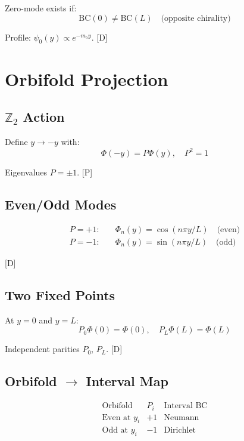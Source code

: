 \documentclass[11pt,a4paper]{article}
\newcommand{\tagD}{\textcolor{blue!70!black}{[D]}}
\newcommand{\tagP}{\textcolor{green!50!black}{[P]}}
\begin{document}
Zero-mode exists if:
\begin{equation}
\label{eq:app-zero-mode}
\text{BC}(0) \neq \text{BC}(L) \quad \text{(opposite chirality)}
\end{equation}

Profile: $\psi_0(y) \propto e^{-m_5 y}$. \tagD

\section{Orbifold Projection}
\label{app:orbifold}

\subsection{$\mathbb{Z}_2$ Action}

Define $y \to -y$ with:
\begin{equation}
\label{eq:app-z2}
\Phi(-y) = P \Phi(y), \quad P^2 = 1
\end{equation}

Eigenvalues $P = \pm 1$. \tagP

\subsection{Even/Odd Modes}

\begin{align}
\label{eq:app-even}
P = +1: \quad & \Phi_n(y) = \cos(n\pi y/L) \quad \text{(even)} \\
\label{eq:app-odd}
P = -1: \quad & \Phi_n(y) = \sin(n\pi y/L) \quad \text{(odd)}
\end{align}

\tagD

\subsection{Two Fixed Points}

At $y = 0$ and $y = L$:
\begin{equation}
\label{eq:app-fixed}
P_0 \Phi(0) = \Phi(0), \quad P_L \Phi(L) = \Phi(L)
\end{equation}

Independent parities $P_0$, $P_L$. \tagD

\subsection{Orbifold $\to$ Interval Map}

\begin{equation}
\label{eq:app-orb-int}
\begin{array}{c|c|c}
\text{Orbifold} & P_i & \text{Interval BC} \\
\hline
\text{Even at } y_i & +1 & \text{Neumann} \\
\text{Odd at } y_i & -1 & \text{Dirichlet}
\end{array}
\end{equation}
\end{document}
